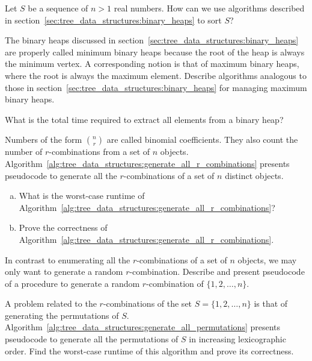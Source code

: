 \begin{problem}
\item Let $S$ be a sequence of $n > 1$ real numbers. How can we use
  algorithms described in
  section~\ref{sec:tree_data_structures:binary_heaps} to sort $S$?

\item The binary heaps discussed in
  section~\ref{sec:tree_data_structures:binary_heaps} are properly
  called minimum binary heaps because the
  root of the heap is always the minimum vertex. A corresponding
  notion is that of maximum binary heaps,
  where the root is always the maximum element. Describe algorithms
  analogous to those in
  section~\ref{sec:tree_data_structures:binary_heaps} for managing
  maximum binary heaps.

\item What is the total time required to extract all elements from a
  binary heap?

\item Numbers of the form $\binom{n}{r}$ are called
  binomial coefficients. They also count
  the number of $r$-combinations from a set of $n$ objects.
  Algorithm~\ref{alg:tree_data_structures:generate_all_r_combinations}
  presents pseudocode to generate all the $r$-combinations of a set of
  $n$ distinct objects.
  \begin{enumerate}[(a)]
  \item What is the worst-case runtime of
    Algorithm~\ref{alg:tree_data_structures:generate_all_r_combinations}?

  \item Prove the correctness of
    Algorithm~\ref{alg:tree_data_structures:generate_all_r_combinations}.
  \end{enumerate}

\item In contrast to enumerating all the $r$-combinations of a set of
  $n$ objects, we may only want to generate a random
  $r$-combination. Describe and present pseudocode of a procedure to
  generate a random $r$-combination of $\{1, 2, \dots, n\}$.

\item A problem related to the $r$-combinations of the set
  $S = \{1, 2, \dots, n\}$ is that of generating the permutations of
  $S$. Algorithm~\ref{alg:tree_data_structures:generate_all_permutations}
  presents pseudocode to generate all the permutations of $S$ in
  increasing lexicographic order. Find the worst-case runtime of this
  algorithm and prove its correctness.


\end{problem}
